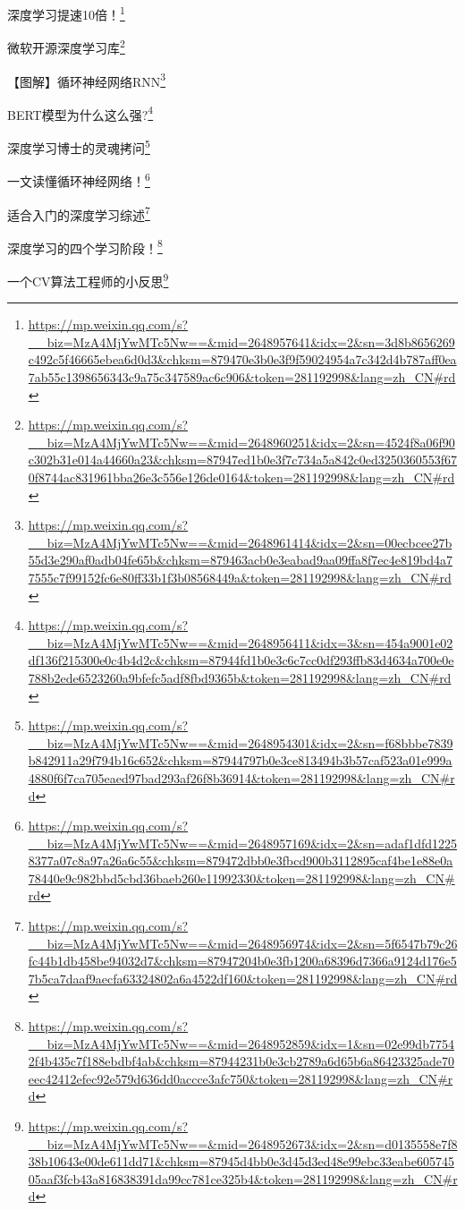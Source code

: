 \documentclass[]{ctexbook}
\renewcommand{\href}[2]{#2\footnote{\url{#1}}}
\begin{document}
\href{https://mp.weixin.qq.com/s?__biz=MzA4MjYwMTc5Nw==\&mid=2648957641\&idx=2\&sn=3d8b8656269c492c5f46665ebea6d0d3\&chksm=879470e3b0e3f9f59024954a7c342d4b787aff0ea7ab55c1398656343c9a75c347589ac6c906\&token=281192998\&lang=zh_CN\#rd}{深度学习提速10倍！}

\href{https://mp.weixin.qq.com/s?__biz=MzA4MjYwMTc5Nw==\&mid=2648960251\&idx=2\&sn=4524f8a06f90c302b31e014a44660a23\&chksm=87947ed1b0e3f7c734a5a842c0ed3250360553f670f8744ac831961bba26e3c556e126de0164\&token=281192998\&lang=zh_CN\#rd}{微软开源深度学习库}

\href{https://mp.weixin.qq.com/s?__biz=MzA4MjYwMTc5Nw==\&mid=2648961414\&idx=2\&sn=00ecbcee27b55d3e290af0adb04fe65b\&chksm=879463acb0e3eabad9aa09ffa8f7ec4e819bd4a77555c7f99152fc6e80ff33b1f3b08568449a\&token=281192998\&lang=zh_CN\#rd}{【图解】循环神经网络RNN}

\href{https://mp.weixin.qq.com/s?__biz=MzA4MjYwMTc5Nw==\&mid=2648956411\&idx=3\&sn=454a9001e02df136f215300e0c4b4d2c\&chksm=87944fd1b0e3c6c7cc0df293ffb83d4634a700e0e788b2ede6523260a9bfefc5adf8fbd9365b\&token=281192998\&lang=zh_CN\#rd}{BERT模型为什么这么强?}

\href{https://mp.weixin.qq.com/s?__biz=MzA4MjYwMTc5Nw==\&mid=2648954301\&idx=2\&sn=f68bbbe7839b842911a29f794b16c652\&chksm=87944797b0e3ce813494b3b57caf523a01e999a4880f6f7ca705eaed97bad293af26f8b36914\&token=281192998\&lang=zh_CN\#rd}{深度学习博士的灵魂拷问}

\href{https://mp.weixin.qq.com/s?__biz=MzA4MjYwMTc5Nw==\&mid=2648957169\&idx=2\&sn=adaf1dfd12258377a07c8a97a26a6c55\&chksm=879472dbb0e3fbcd900b3112895caf4be1e88e0a78440e9c982bbd5cbd36baeb260e11992330\&token=281192998\&lang=zh_CN\#rd}{一文读懂循环神经网络！}

\href{https://mp.weixin.qq.com/s?__biz=MzA4MjYwMTc5Nw==\&mid=2648956974\&idx=2\&sn=5f6547b79c26fc44b1db458be94032d7\&chksm=87947204b0e3fb1200a68396d7366a9124d176e57b5ca7daaf9aecfa63324802a6a4522df160\&token=281192998\&lang=zh_CN\#rd}{适合入门的深度学习综述}

\href{https://mp.weixin.qq.com/s?__biz=MzA4MjYwMTc5Nw==\&mid=2648952859\&idx=1\&sn=02e99db77542f4b435c7f188ebdbf4ab\&chksm=87944231b0e3cb2789a6d65b6a86423325ade70eec42412efec92e579d636dd0accce3afc750\&token=281192998\&lang=zh_CN\#rd}{深度学习的四个学习阶段！}

\href{https://mp.weixin.qq.com/s?__biz=MzA4MjYwMTc5Nw==\&mid=2648952673\&idx=2\&sn=d0135558e7f838b10643e00de611dd71\&chksm=87945d4bb0e3d45d3ed48e99ebc33eabe60574505aaf3fcb43a816838391da99cc781ce325b4\&token=281192998\&lang=zh_CN\#rd}{一个CV算法工程师的小反思}
\end{document}
